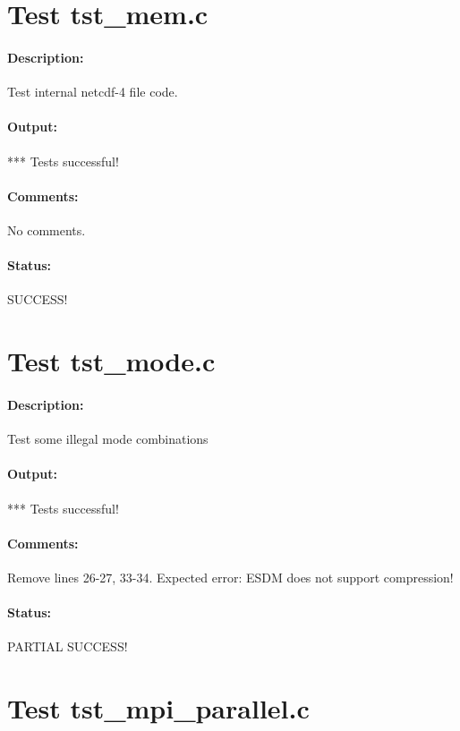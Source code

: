 \section{Test tst\_mem.c}

\paragraph{Description:} Test internal netcdf-4 file code.

\paragraph{Output:} *** Tests successful!

\paragraph{Comments:} No comments.

\paragraph{Status:} SUCCESS!

\section{Test tst\_mode.c}

\paragraph{Description:} Test some illegal mode combinations

\paragraph{Output:} *** Tests successful!

\paragraph{Comments:} Remove lines 26-27, 33-34. Expected error: ESDM does not support compression!

\paragraph{Status:} PARTIAL SUCCESS!
\section{Test tst\_mpi\_parallel.c}


